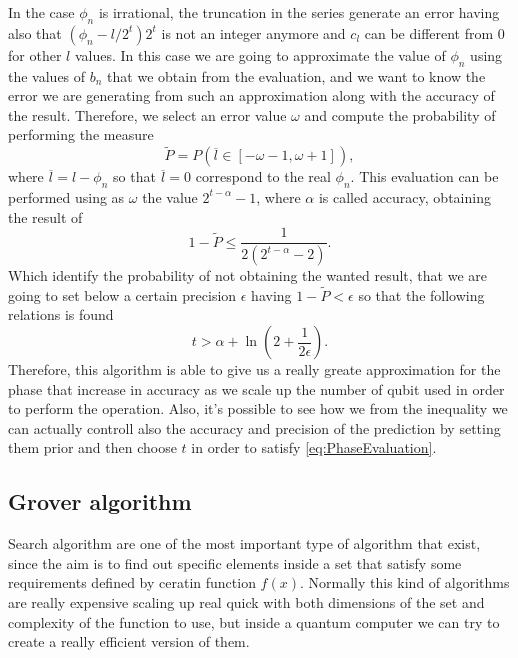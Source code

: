 {    In the case $\phi_n$ is irrational, the truncation in the series generate an error having also that $(\phi_n - l/2^t)2^t$ is not an integer anymore and $c_l$ can be different from $0$ for other $l$ values. In this case we are going to approximate the value of $\phi_n$ using the values of $b_n$ that we obtain from the evaluation, and we want to know the error we are generating from such an approximation along with the accuracy of the result. Therefore, we select an error value $\omega$ and compute the probability of performing the measure 
    \begin{equation}
        \tilde{P} = P(\overline{l} \in [-\omega-1, \omega+1]),
    \end{equation}
    where $\overline{l} = l - \phi_n$ so that $\overline{l} = 0$ correspond to the real $\phi_n$. This evaluation can be performed using as $\omega$ the value $2^{t - \alpha} - 1$, where $\alpha$ is called accuracy, obtaining the result of
    \begin{equation}
        1 - \tilde{P} \le \frac{1}{2(2^{t-\alpha} - 2)}.
    \end{equation}
    Which identify the probability of not obtaining the wanted result, that we are going to set below a certain precision $\epsilon$ having $1 - \tilde{P}<\epsilon$ so that the following relations is found
    \begin{equation}
        t > \alpha + \ln\left( 2 + \frac{1}{2\epsilon} \right).
    \end{equation}
}
\noindent
Therefore, this algorithm is able to give us a really greate approximation for the phase that increase in accuracy as we scale up the number of qubit used in order to perform the operation. Also, it's possible to see how we from the inequality we can actually controll also the accuracy and precision of the prediction by setting them prior and then choose $t$ in order to satisfy \eqref{eq:PhaseEvaluation}.

\subsection{Grover algorithm}

Search algorithm are one of the most important type of algorithm that exist, since the aim is to find out specific elements inside a set that satisfy some requirements defined by ceratin function $f(x)$. Normally this kind of algorithms are really expensive scaling up real quick with both dimensions of the set and complexity of the function to use, but inside a quantum computer we can try to create a really efficient version of them.

